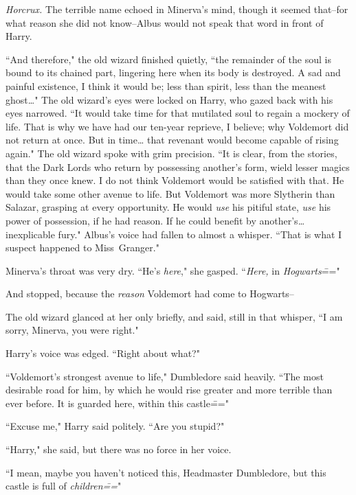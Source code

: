 \emph{Horcrux.} The terrible name echoed in Minerva's mind, though it seemed that\---for what reason she did not know\---Albus would not speak that word in front of Harry.

``And therefore," the old wizard finished quietly, ``the remainder of the soul is bound to its chained part, lingering here when its body is destroyed. A sad and painful existence, I think it would be; less than spirit, less than the meanest ghost{\ldots}" The old wizard's eyes were locked on Harry, who gazed back with his eyes narrowed. ``It would take time for that mutilated soul to regain a mockery of life. That is why we have had our ten-year reprieve, I believe; why Voldemort did not return at once. But in time{\ldots} that revenant would become capable of rising again." The old wizard spoke with grim precision. ``It is clear, from the stories, that the Dark Lords who return by possessing another's form, wield lesser magics than they once knew. I do not think Voldemort would be satisfied with that. He would take some other avenue to life. But Voldemort was more Slytherin than Salazar, grasping at every opportunity. He would \emph{use} his pitiful state, \emph{use} his power of possession, if he had reason. If he could benefit by another's{\ldots} inexplicable fury." Albus's voice had fallen to almost a whisper. ``That is what I suspect happened to Miss~Granger."

Minerva's throat was very dry. ``He's \emph{here}," she gasped. ``\emph{Here,} in \emph{Hogwarts}\==="

And stopped, because the \emph{reason} Voldemort had come to Hogwarts\---

The old wizard glanced at her only briefly, and said, still in that whisper, ``I am sorry, Minerva, you were right."

Harry's voice was edged. ``Right about what?"

``Voldemort's strongest avenue to life," Dumbledore said heavily. ``The most desirable road for him, by which he would rise greater and more terrible than ever before. It is guarded here, within this castle\==="

``Excuse me," Harry said politely. ``Are you stupid?"

``Harry," she said, but there was no force in her voice.

``I mean, maybe you haven't noticed this, Headmaster Dumbledore, but this castle is full of \emph{children\===}"

